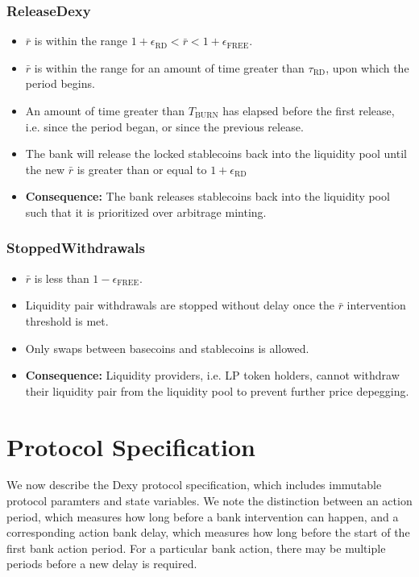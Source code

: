 \documentclass{ifcolog}
\newcommand{\rr}{\bar{r}}
\newcommand{\dx}{Dexy}
\begin{document}
\newpage 

\subsubsection{ReleaseDexy}
  \begin{itemize}
    \item $\rr$ is within the range $1 + \epsilon_{\textrm{RD}} < \rr <  1 + \epsilon_{\textrm{FREE}}$.
    \item $\rr$ is within the range for an amount of time greater than $\tau_{\textrm{RD}}$, upon which the period begins.
    \item An amount of time greater than $T_{\textrm{BURN}}$ has elapsed before the first release, i.e. since the period began, or since the previous release. 
    \item The bank will release the locked stablecoins back into the liquidity pool until the new $\rr$ is greater than or equal to $1 + \epsilon_{\textrm{RD}}$
    \item \textbf{Consequence:} The bank releases stablecoins back into the liquidity pool such that it is prioritized over arbitrage minting.
  \end{itemize}

\subsubsection{StoppedWithdrawals}
  \begin{itemize}
    \item $\rr$ is less than $1 - \epsilon_{\textrm{FREE}}$.
    \item Liquidity pair withdrawals are stopped without delay once the $\rr$ intervention threshold is met.
    \item Only swaps between basecoins and stablecoins is allowed.
    \item \textbf{Consequence:} Liquidity providers, i.e. LP token holders, cannot withdraw their liquidity pair from the liquidity pool to prevent further price depegging.
  \end{itemize}

\section{Protocol Specification}
\label{sec:protocol}
We now describe the \dx{} protocol specification, which includes immutable protocol paramters and state variables. 
We note the distinction between an action period, which measures how long before a bank intervention can happen, 
and a corresponding action bank delay, which measures how long before the start of the first bank action period. 
For a particular bank action, there may be multiple periods before a new delay is required.
\end{document}
